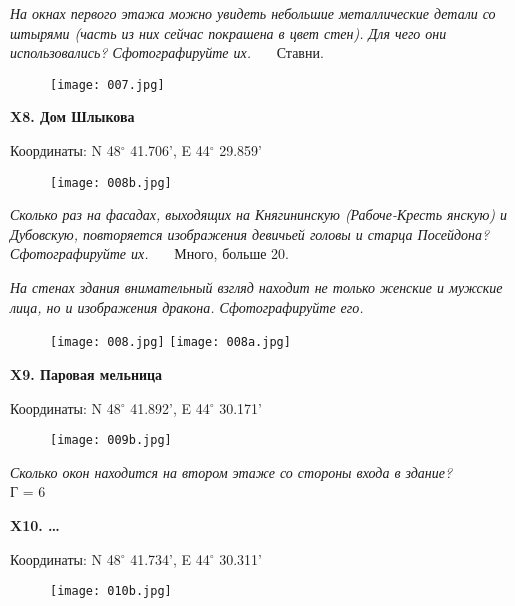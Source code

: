 \documentclass[pscyr,titlepage]{hedreport}
\begin{document}
  \emph{На окнах первого этажа можно увидеть небольшие металлические детали со
  штырями (часть из них сейчас покрашена в цвет стен). Для чего они
  использовались? Сфотографируйте их.} \ \ \ Ставни.
  \begin{figure}[htbp]
    \center
    \texttt{[image: 007.jpg]}
  \end{figure}

  \pagebreak

  \textbf{X8. Дом Шлыкова}

  Координаты: N 48\( ^\circ \) 41.706', E 44\( ^\circ \) 29.859'

  \begin{figure}[htbp]
    \center
    \texttt{[image: 008b.jpg]}
  \end{figure}
  
  \emph{Сколько раз на фасадах, выходящих на Княгининскую (Рабоче-Кресть\-%
  янскую) и Дубовскую, повторяется изображения девичьей головы и старца
  Посейдона? Сфотографируйте их.} \ \ \ Много, больше 20.

  \emph{На стенах здания внимательный взгляд находит не только женские и мужские
  лица, но и изображения дракона. Сфотографируйте его.} \\

  \begin{figure}[htbp]
    \center
    \texttt{[image: 008.jpg]} \hspace{2em}
    \texttt{[image: 008a.jpg]}
  \end{figure}

  \pagebreak

  \textbf{X9. Паровая мельница}

  Координаты: N 48\( ^\circ \) 41.892', E 44\( ^\circ \) 30.171'

  \begin{figure}[htbp]
    \center
    \texttt{[image: 009b.jpg]}
  \end{figure}

  \emph{Сколько окон находится на втором этаже со стороны входа в здание?} \\
  Г = 6

  \pagebreak

  \textbf{X10. \ldots}

  Координаты: N 48\( ^\circ \) 41.734', E 44\( ^\circ \) 30.311'

  \begin{figure}[htbp]
    \center
    \texttt{[image: 010b.jpg]}
  \end{figure}
\end{document}
